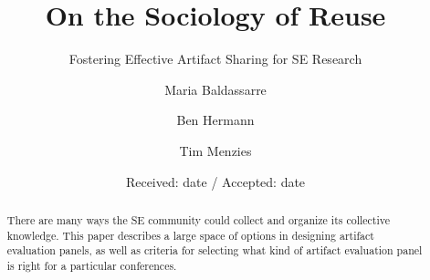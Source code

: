 \documentclass[smallextended]{svjour3}       %
\begin{document}
\title{On the Sociology of Reuse} %
\subtitle{Fostering Effective Artifact Sharing for SE Research}


\author{Maria  Baldassarre     
\and Ben  Hermann \and
        Tim Menzies %
}


         


\date{Received: date / Accepted: date}

\newcommand{\bi}{\begin{itemize}}
\newcommand{\ei}{\end{itemize}}
\maketitle

\begin{abstract}
There are many ways the SE community could collect and organize its collective knowledge. 
This paper describes a large space of options in designing artifact evaluation panels, as well as criteria for selecting what kind of artifact evaluation panel is right for a particular conferences.
\end{abstract}
\end{document}
